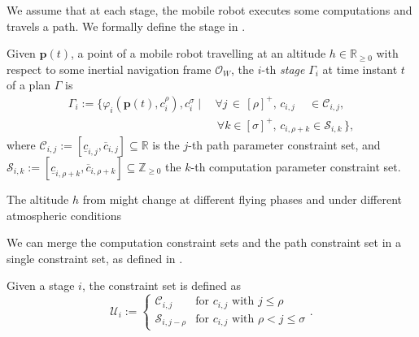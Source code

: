 We assume that at each stage, the mobile robot executes some computations and travels a path. We formally define the stage in .

\begin{highlight}  
  \begin{defn}[Stage]\label{def:stage}
    Given $\mathbf{p}(t)$, a point of a mobile robot travelling at an altitude $h\in\mathbb{R}_{\geq 0}$ with respect to some inertial navigation frame $\mathcal{O}_W$, the $i$-th \emph{stage} $\Gamma_i$ at time instant $t$ of a plan $\Gamma$ is
    \begin{equation*}\begin{split}
      \Gamma_i:=\{\varphi_i(\mathbf{p}(t),c_i^\rho),c_i^\sigma\mid
      \,&\forall j\,\in\,[\rho]^+,\,c_{i,j}\,\,\,\,\,\,\,\in\mathcal{C}_{i,j},\,\\
        &\,\forall k\in[\sigma]^+,\,c_{i,\rho+k}\in\mathcal{S}_{i,k}\,\},
    \end{split}\end{equation*}
    where $\mathcal{C}_{i,j}:=[\underline{c}_{i,j},\overline{c}_{i,j}]\subseteq\mathbb{R}$ is the $j$-th path parameter constraint set, and $\mathcal{S}_{i,k}:=[\underline{c}_{i,\rho+k},\overline{c}_{i,\rho+k}]\subseteq\mathbb{Z}_{\geq 0}$ the $k$-th computation parameter constraint set.
  \end{defn}
\end{highlight}

The altitude $h$ from  might change at different flying phases and under different atmospheric conditions

We can merge the computation constraint sets and the path constraint set in a single constraint set, as defined in .

\begin{highlight}
  \begin{defn}\label{def:const-set}
    Given a stage $i$, the constraint set is defined as
    \begin{equation*}
      \mathcal{U}_i:=\begin{cases}
        \mathcal{C}_{i,j} & \text{for } c_{i,j} \text{ with } j\leq\rho\\
        \mathcal{S}_{i,j-\rho} & \text{for } c_{i,j} \text{ with } \rho<j\leq\sigma
      \end{cases}.
    \end{equation*}
    
  \end{defn}
\end{highlight}


